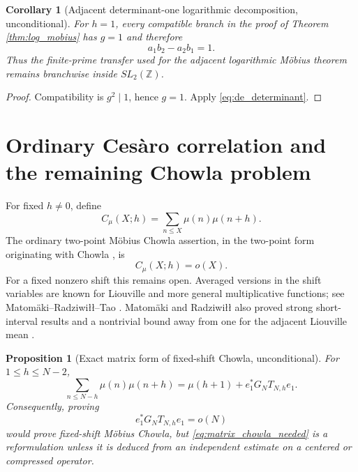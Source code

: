 \documentclass[11pt]{amsart}
\numberwithin{equation}{section}
\theoremstyle{plain}
\newtheorem{proposition}[theorem]{Proposition}
\newtheorem{corollary}[theorem]{Corollary}
\theoremstyle{definition}
\theoremstyle{remark}
\newcommand{\Z}{\mathbb Z}
\newcommand{\mob}{\mu}
\begin{document}
\begin{corollary}[Adjacent determinant-one logarithmic decomposition, unconditional]
\label{cor:adjacent_SL2_log}
For $h=1$, every compatible branch in the proof of Theorem \ref{thm:log_mobius} has $g=1$ and therefore
\begin{equation}
a_1b_2-a_2b_1=1.
\label{eq:adjacent_branch_SL2}
\end{equation}
Thus the finite-prime transfer used for the adjacent logarithmic Möbius theorem remains branchwise inside $SL_2(\Z)$.
\end{corollary}

\begin{proof}
Compatibility is $g^2\mid1$, hence $g=1$.  Apply \eqref{eq:de_determinant}.
\end{proof}

\section{Ordinary Cesàro correlation and the remaining Chowla problem}
\label{sec:cesaro_chowla}

For fixed $h\ne0$, define
\begin{equation}
C_\mob(X;h)=\sum_{n\le X}\mob(n)\mob(n+h).
\label{eq:mu_cesaro_correlation}
\end{equation}
The ordinary two-point Möbius Chowla assertion, in the two-point form originating with Chowla \cite{Chowla1965}, is
\begin{equation}
C_\mob(X;h)=o(X).
\label{eq:mu_chowla_target}
\end{equation}
For a fixed nonzero shift this remains open.  Averaged versions in the shift variables are known for Liouville and more general multiplicative functions; see Matomäki--Radziwiłł--Tao \cite{MRT2015}.  Matomäki and Radziwiłł also proved strong short-interval results and a nontrivial bound away from one for the adjacent Liouville mean \cite{MatomakiRadziwill2016}.

\begin{proposition}[Exact matrix form of fixed-shift Chowla, unconditional]
\label{prop:matrix_chowla}
For $1\le h\le N-2$,
\begin{equation}
\sum_{n\le N-h}\mob(n)\mob(n+h)
=\mob(h+1)+e_1^*G_NT_{N,h}e_1.
\label{eq:matrix_chowla_exact}
\end{equation}
Consequently, proving
\begin{equation}
e_1^*G_NT_{N,h}e_1=o(N)
\label{eq:matrix_chowla_needed}
\end{equation}
would prove fixed-shift Möbius Chowla, but \eqref{eq:matrix_chowla_needed} is a reformulation unless it is deduced from an independent estimate on a centered or compressed operator.
\end{proposition}
\end{document}
